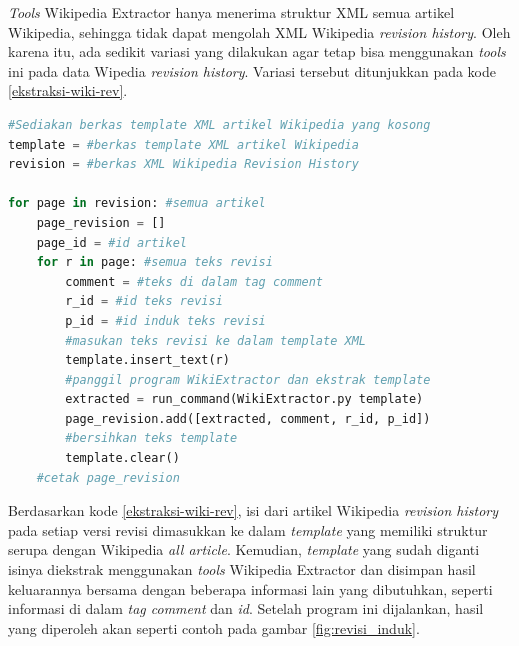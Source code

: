\textit{Tools} Wikipedia Extractor hanya menerima struktur XML semua artikel Wikipedia, sehingga tidak dapat mengolah XML Wikipedia \textit{revision history}. Oleh karena itu, ada sedikit variasi yang dilakukan agar tetap bisa menggunakan \textit{tools} ini pada data Wipedia \textit{revision history}. Variasi tersebut ditunjukkan pada kode \ref{ekstraksi-wiki-rev}. 

\begin{lstlisting}[language=Python, caption={Ekstraksi Wikipedia Revision History}, label={ekstraksi-wiki-rev}]
#Sediakan berkas template XML artikel Wikipedia yang kosong
template = #berkas template XML artikel Wikipedia
revision = #berkas XML Wikipedia Revision History

for page in revision: #semua artikel 
	page_revision = []
	page_id = #id artikel
	for r in page: #semua teks revisi 
		comment = #teks di dalam tag comment
		r_id = #id teks revisi
		p_id = #id induk teks revisi
		#masukan teks revisi ke dalam template XML
		template.insert_text(r)
		#panggil program WikiExtractor dan ekstrak template
		extracted = run_command(WikiExtractor.py template)
		page_revision.add([extracted, comment, r_id, p_id])
		#bersihkan teks template
		template.clear()
	#cetak page_revision
\end{lstlisting}
Berdasarkan kode \ref{ekstraksi-wiki-rev}, isi dari artikel Wikipedia \textit{revision history} pada setiap versi revisi dimasukkan ke dalam \textit{template} yang memiliki struktur serupa dengan Wikipedia \textit{all article}. Kemudian, \textit{template} yang sudah diganti isinya diekstrak menggunakan \textit{tools} Wikipedia Extractor dan disimpan hasil keluarannya bersama dengan beberapa informasi lain yang dibutuhkan, seperti informasi di dalam \textit{tag comment} dan \textit{id}. Setelah program ini dijalankan, hasil yang diperoleh akan seperti contoh pada gambar \ref{fig:revisi_induk}. 

